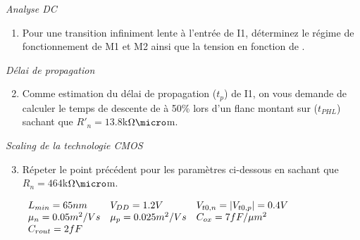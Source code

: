 \emph{Analyse DC}
\begin{enumerate}
	\item Pour une transition infiniment lente à l'entrée de I1, déterminez le régime de
	fonctionnement de M1 et M2 ainsi que la tension \vout en fonction de \vin.
\end{enumerate}

\emph{Délai de propagation}
\begin{enumerate}
	\setcounter{enumi}{1}
	\item Comme estimation du délai de propagation ($t_p$) de I1, on vous demande de
	calculer le temps de descente de \vout à 50\% lors d'un flanc montant sur \vin
	($t_{PHL}$) sachant que $R'_n =13.8$k$\Omega\micro$m.
\end{enumerate}

\emph{Scaling de la technologie CMOS}
\begin{enumerate}
	\setcounter{enumi}{2}
	\item Répeter le point précédent pour les paramètres ci-dessous en sachant que
	$R_n = 464$k$\Omega\micro$m.

	\begin{center}
	$
		\begin{array}{l l l}
			L_{min} = 65 nm 		& V_{DD} = 1.2V 		&V_{t0,n} = |V_{t0,p}| = 0.4V \\
			\mu_n = 0.05 m^2/Vs 	& \mu_p= 0.025 m^2/Vs	& C_{ox} = 7 fF/\mu m^2 \\
			C_{rout} = 2fF			&						& \\
		\end{array}
	$
	\end{center}
\end{enumerate}

